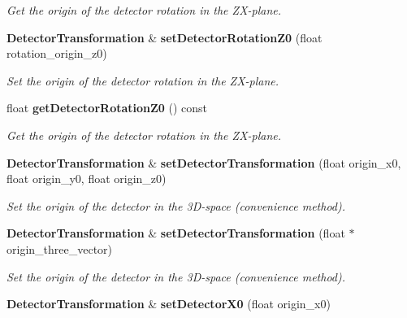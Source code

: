 \begin{DoxyCompactItemize}
\begin{DoxyCompactList}\small\item\em Get the origin of the detector rotation in the ZX-\/plane. \item\end{DoxyCompactList}\item 
{\bf DetectorTransformation} \& {\bf setDetectorRotationZ0} (float rotation\_\-origin\_\-z0)\label{classCALICE_1_1DetectorTransformation_aec6ee5baab95ce9cb39df88ca04e0e80}

\begin{DoxyCompactList}\small\item\em Set the origin of the detector rotation in the ZX-\/plane. \item\end{DoxyCompactList}\item 
float {\bf getDetectorRotationZ0} () const \label{classCALICE_1_1DetectorTransformation_afd32ba2a1636520f713cee65d6f5b5dc}

\begin{DoxyCompactList}\small\item\em Get the origin of the detector rotation in the ZX-\/plane. \item\end{DoxyCompactList}\item 
{\bf DetectorTransformation} \& {\bf setDetectorTransformation} (float origin\_\-x0, float origin\_\-y0, float origin\_\-z0)\label{classCALICE_1_1DetectorTransformation_aff20896660ff50a94ffe067ccdc56ac6}

\begin{DoxyCompactList}\small\item\em Set the origin of the detector in the 3D-\/space (convenience method). \item\end{DoxyCompactList}\item 
{\bf DetectorTransformation} \& {\bf setDetectorTransformation} (float $\ast$origin\_\-three\_\-vector)\label{classCALICE_1_1DetectorTransformation_ae390bbf318d5747c72d77b6cd364540b}

\begin{DoxyCompactList}\small\item\em Set the origin of the detector in the 3D-\/space (convenience method). \item\end{DoxyCompactList}\item 
{\bf DetectorTransformation} \& {\bf setDetectorX0} (float origin\_\-x0)\label{classCALICE_1_1DetectorTransformation_a12be9cd46f36fbd4995afb93b0001630}


\end{DoxyCompactItemize}
